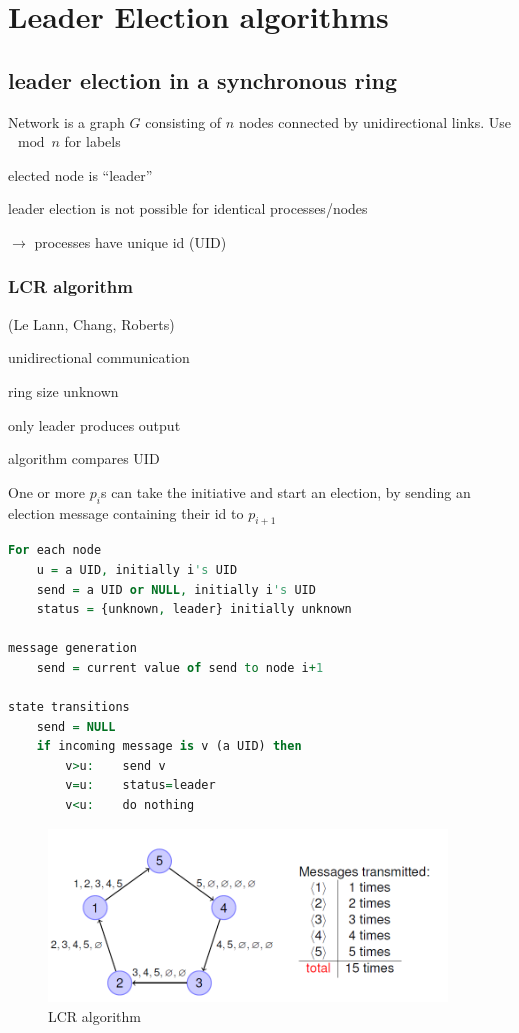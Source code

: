 \chapter{Leader Election algorithms}
\section{leader election in a synchronous ring}
Network is a graph $G$ consisting of $n$ nodes connected by unidirectional links. Use $\mod n$ for labels\\
\begin{compactitem}
\item elected node is ``leader''
\item leader election is not possible for identical processes/nodes
\item [$\rightarrow$] processes have unique id (UID)
\end{compactitem}

\subsection{LCR algorithm}
(Le Lann, Chang, Roberts)\\

\begin{compactitem}
\item unidirectional communication
\item ring size unknown
\item only leader produces output
\item algorithm compares UID
\item One or more $p_i$s can take the initiative and start an election, by sending an election message containing their id to $p_{i+1}$
\end{compactitem}

\begin{lstlisting}[mathescape, language=VHDL]
For each node
	u = a UID, initially i's UID
	send = a UID or NULL, initially i's UID
	status = {unknown, leader} initially unknown

message generation
	send = current value of send to node i+1

state transitions
	send = NULL
	if incoming message is v (a UID) then
		v>u: 	send v
		v=u: 	status=leader
		v<u: 	do nothing
\end{lstlisting}

\begin{figure}[h]
	\centering
	\includegraphics[width=400px]{gfx/lcr.png}
	\caption{LCR algorithm}
	\label{img:lcr}
\end{figure}

